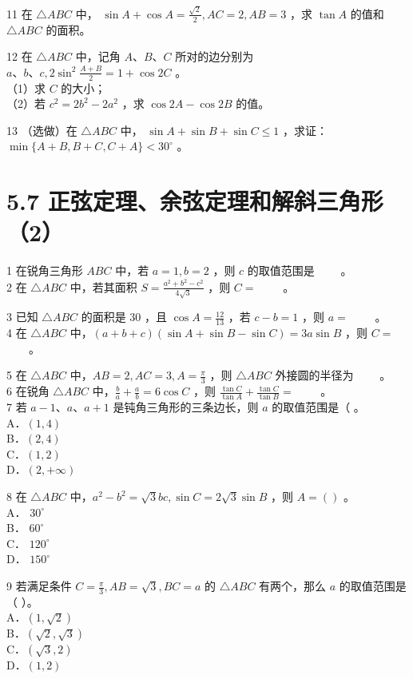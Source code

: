 \documentclass[10pt]{article}
\begin{document}
11 在 \(\triangle A B C\) 中， \(\sin A+\cos A=\frac{\sqrt{2}}{2}, A C=2, A B=3\) ，求 \(\tan A\) 的值和 \(\triangle A B C\) 的面积。

12 在 \(\triangle A B C\) 中，记角 \(A 、 B 、 C\) 所对的边分别为 \(a 、 b 、 c, 2 \sin ^{2} \frac{A+B}{2}=1+\cos 2 C\) 。\\
（1）求 \(C\) 的大小；\\
（2）若 \(c^{2}=2 b^{2}-2 a^{2}\) ，求 \(\cos 2 A-\cos 2 B\) 的值。

13 （选做）在 \(\triangle A B C\) 中， \(\sin A+\sin B+\sin C \leqslant 1\) ，求证： \(\min \{A+B, B+C, C+A\}<30^{\circ}\) 。

\section*{5.7 正弦定理、余弦定理和解斜三角形（2）}
1 在锐角三角形 \(A B C\) 中，若 \(a=1, b=2\) ，则 \(c\) 的取值范围是 \(\qquad\)。\\
2 在 \(\triangle A B C\) 中，若其面积 \(S=\frac{a^{2}+b^{2}-c^{2}}{4 \sqrt{3}}\) ，则 \(C=\) \(\qquad\)。

3 已知 \(\triangle A B C\) 的面积是 30 ，且 \(\cos A=\frac{12}{13}\) ，若 \(c-b=1\) ，则 \(a=\) \(\qquad\)。\\
4 在 \(\triangle A B C\) 中，\((a+b+c)(\sin A+\sin B-\sin C)=3 a \sin B\) ，则 \(C=\) \(\qquad\)。

5 在 \(\triangle A B C\) 中，\(A B=2, A C=3, A=\frac{\pi}{3}\) ，则 \(\triangle A B C\) 外接圆的半径为 \(\qquad\)。\\
6 在锐角 \(\triangle A B C\) 中，\(\frac{b}{a}+\frac{a}{b}=6 \cos C\) ，则 \(\frac{\tan C}{\tan A}+\frac{\tan C}{\tan B}=\) \(\qquad\)。\\
7 若 \(a-1 、 a 、 a+1\) 是钝角三角形的三条边长，则 \(a\) 的取值范围是（ 。\\
A．\((1,4)\)\\
B．\((2,4)\)\\
C．\((1,2)\)\\
D．\((2,+\infty)\)

8 在 \(\triangle A B C\) 中，\(a^{2}-b^{2}=\sqrt{3} b c, \sin C=2 \sqrt{3} \sin B\) ，则 \(A=()\) 。\\
A． \(30^{\circ}\)\\
B． \(60^{\circ}\)\\
C． \(120^{\circ}\)\\
D． \(150^{\circ}\)

9 若满足条件 \(C=\frac{\pi}{3}, A B=\sqrt{3}, B C=a\) 的 \(\triangle A B C\) 有两个，那么 \(a\) 的取值范围是（ ）。\\
A．\((1, \sqrt{2})\)\\
B．\((\sqrt{2}, \sqrt{3})\)\\
C．\((\sqrt{3}, 2)\)\\
D．\((1,2)\)
\end{document}
